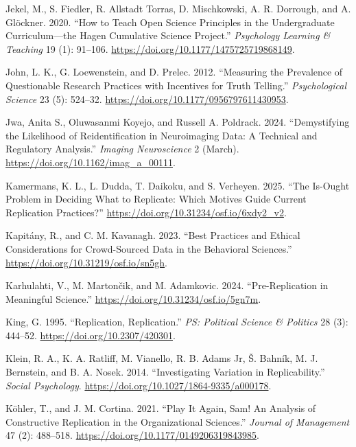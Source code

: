 \documentclass[
  letterpaper,
  DIV=11,
  openany,
  fontsize=12pt,
  parskip=half,
  headings=big,
  numbers=noenddot,
  titlepage=false]{scrreprt}
\newlength{\cslhangindent}
\newenvironment{CSLReferences}[2] %
 {\begin{list}{}{%
  \setlength{\itemindent}{0pt}
  \setlength{\leftmargin}{0pt}
  \setlength{\parsep}{0pt}
  \ifodd #1
   \setlength{\leftmargin}{\cslhangindent}
   \setlength{\itemindent}{-1\cslhangindent}
  \fi
  \setlength{\itemsep}{#2\baselineskip}}}
 {\end{list}}
\begin{document}
\begin{CSLReferences}{1}{0}
Jekel, M., S. Fiedler, R. Allstadt Torras, D. Mischkowski, A. R.
Dorrough, and A. Glöckner. 2020. {``How to Teach Open Science Principles
in the Undergraduate Curriculum---the Hagen Cumulative Science
Project.''} \emph{Psychology Learning \& Teaching} 19 (1): 91--106.
\url{https://doi.org/10.1177/1475725719868149}.

John, L. K., G. Loewenstein, and D. Prelec. 2012. {``Measuring the
Prevalence of Questionable Research Practices with Incentives for Truth
Telling.''} \emph{Psychological Science} 23 (5): 524--32.
\url{https://doi.org/10.1177/0956797611430953}.

Jwa, Anita S., Oluwasanmi Koyejo, and Russell A. Poldrack. 2024.
{``Demystifying the Likelihood of Reidentification in Neuroimaging Data:
A Technical and Regulatory Analysis.''} \emph{Imaging Neuroscience} 2
(March). \url{https://doi.org/10.1162/imag_a_00111}.

Kamermans, K. L., L. Dudda, T. Daikoku, and S. Verheyen. 2025. {``The
Is-Ought Problem in Deciding What to Replicate: Which Motives Guide
Current Replication Practices?''}
\url{https://doi.org/10.31234/osf.io/6xdy2_v2}.

Kapitány, R., and C. M. Kavanagh. 2023. {``Best Practices and Ethical
Considerations for Crowd-Sourced Data in the Behavioral Sciences.''}
\url{https://doi.org/10.31219/osf.io/sn5gh}.

Karhulahti, V., M. Martončik, and M. Adamkovic. 2024. {``Pre-Replication
in Meaningful Science.''} \url{https://doi.org/10.31234/osf.io/5gn7m}.

King, G. 1995. {``Replication, Replication.''} \emph{PS: Political
Science \& Politics} 28 (3): 444--52.
\url{https://doi.org/10.2307/420301}.

Klein, R. A., K. A. Ratliff, M. Vianello, R. B. Adams Jr, Š. Bahník, M.
J. Bernstein, and B. A. Nosek. 2014. {``Investigating Variation in
Replicability.''} \emph{Social Psychology}.
\url{https://doi.org/10.1027/1864-9335/a000178}.

Köhler, T., and J. M. Cortina. 2021. {``Play It Again, Sam! An Analysis
of Constructive Replication in the Organizational Sciences.''}
\emph{Journal of Management} 47 (2): 488--518.
\url{https://doi.org/10.1177/0149206319843985}.


\end{CSLReferences}
\end{document}
